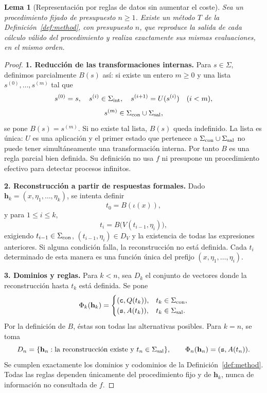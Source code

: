 \documentclass[11pt,a4paper]{article}
\numberwithin{equation}{section}
\newtheorem{lemma}[theorem]{Lema}
\theoremstyle{definition}
\theoremstyle{remark}
\newcommand{\hc}{\mathbf h}
\newcommand{\ct}{\mathtt c}
\newcommand{\st}{\mathtt s}
\newcommand{\paso}[1]{\par\smallskip\noindent\textbf{#1}\quad}
\begin{document}
\begin{lemma}[Representación por reglas de datos sin aumentar el coste]\label{lem:serialization}
Sea un procedimiento fijado de presupuesto $n\ge1$. Existe un método $T$ de la Definición~\ref{def:method}, con presupuesto $n$, que reproduce la salida de cada cálculo válido del procedimiento y realiza exactamente sus mismas evaluaciones, en el mismo orden.
\end{lemma}
\begin{proof}
\paso{1. Reducción de las transformaciones internas.}
Para $s\in\Sigma$, definimos parcialmente $B(s)$ así: si existe un entero $m\ge0$ y una lista $s^{(0)},\ldots,s^{(m)}$ tal que
\[
s^{(0)}=s,\quad s^{(i)}\in\Sigma_{\rm int},\quad
s^{(i+1)}=U(s^{(i)})\quad(i<m),
\]
\[
s^{(m)}\in\Sigma_{\rm con}\cup\Sigma_{\rm sal},
\]
se pone $B(s)=s^{(m)}$. Si no existe tal lista, $B(s)$ queda indefinido. La lista es única: $U$ es una aplicación y el primer estado que pertenece a $\Sigma_{\rm con}\cup\Sigma_{\rm sal}$ no puede tener simultáneamente una transformación interna. Por tanto $B$ es una regla parcial bien definida. Su definición no usa $f$ ni presupone un procedimiento efectivo para detectar procesos infinitos.

\paso{2. Reconstrucción a partir de respuestas formales.}
Dado $\hc_k=(x,\eta_1,\ldots,\eta_k)$, se intenta definir
\[
t_0=B(\iota(x)),
\]
y para $1\le i\le k$,
\[
t_i=B\bigl(V(t_{i-1},\eta_i)\bigr),
\]
exigiendo $t_{i-1}\in\Sigma_{\rm con}$, $(t_{i-1},\eta_i)\in D_V$ y la existencia de todas las expresiones anteriores. Si alguna condición falla, la reconstrucción no está definida. Cada $t_i$ determinado de esta manera es una función única del prefijo $(x,\eta_1,\ldots,\eta_i)$.

\paso{3. Dominios y reglas.}
Para $k<n$, sea $D_k$ el conjunto de vectores donde la reconstrucción hasta $t_k$ está definida. Se pone
\[
\Phi_k(\hc_k)=
\begin{cases}
(\ct,Q(t_k)),&t_k\in\Sigma_{\rm con},\\
(\st,A(t_k)),&t_k\in\Sigma_{\rm sal}.
\end{cases}
\]
Por la definición de $B$, éstas son todas las alternativas posibles. Para $k=n$, se toma
\[
D_n=\{\hc_n:\text{la reconstrucción existe y }t_n\in\Sigma_{\rm sal}\},
\qquad \Phi_n(\hc_n)=(\st,A(t_n)).
\]
Se cumplen exactamente los dominios y codominios de la Definición~\ref{def:method}. Todas las reglas dependen únicamente del procedimiento fijo y de $\hc_k$, nunca de información no consultada de $f$.


\end{proof}
\end{document}
